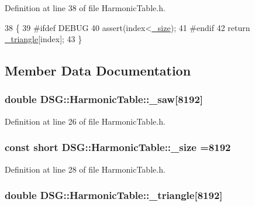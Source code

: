 Definition at line 38 of file Harmonic\+Table.\+h.


\begin{DoxyCode}
38                                                                                \{
39 \textcolor{preprocessor}{#ifdef DEBUG}
40             assert(index<\hyperlink{classDSG_1_1HarmonicTable_a7c4a3c7183bfa5f644d4e15679e41706}{\_size});
41 \textcolor{preprocessor}{#endif}
42             \textcolor{keywordflow}{return} \hyperlink{classDSG_1_1HarmonicTable_af364cbeebefb7b3228557cbe406663cc}{\_triangle}[index];
43         \}
\end{DoxyCode}


\subsection{Member Data Documentation}
\hypertarget{classDSG_1_1HarmonicTable_a2bbcf6810c1613f8261244fe59233f22}{
\subsubsection[{\+\_\+saw}]{\setlength{\rightskip}{0pt plus 5cm}double D\+S\+G\+::\+Harmonic\+Table\+::\+\_\+saw\mbox{[}8192\mbox{]}\hspace{0.3cm}{\ttfamily [protected]}}}\label{classDSG_1_1HarmonicTable_a2bbcf6810c1613f8261244fe59233f22}


Definition at line 26 of file Harmonic\+Table.\+h.

\hypertarget{classDSG_1_1HarmonicTable_a7c4a3c7183bfa5f644d4e15679e41706}{
\subsubsection[{\+\_\+size}]{\setlength{\rightskip}{0pt plus 5cm}const short D\+S\+G\+::\+Harmonic\+Table\+::\+\_\+size =8192\hspace{0.3cm}{\ttfamily [protected]}}}\label{classDSG_1_1HarmonicTable_a7c4a3c7183bfa5f644d4e15679e41706}


Definition at line 28 of file Harmonic\+Table.\+h.

\hypertarget{classDSG_1_1HarmonicTable_af364cbeebefb7b3228557cbe406663cc}{
\subsubsection[{\+\_\+triangle}]{\setlength{\rightskip}{0pt plus 5cm}double D\+S\+G\+::\+Harmonic\+Table\+::\+\_\+triangle\mbox{[}8192\mbox{]}\hspace{0.3cm}{\ttfamily [protected]}}}\label{classDSG_1_1HarmonicTable_af364cbeebefb7b3228557cbe406663cc}


